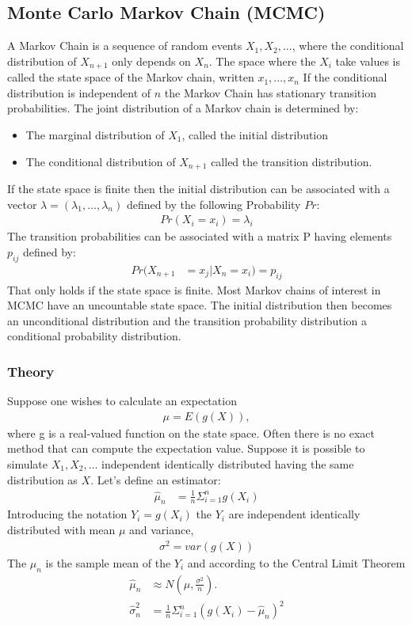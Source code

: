 \documentclass[english]{uzhpub}
\begin{document}
\subsection{Monte Carlo Markov Chain (MCMC)} \label{sec:MCMC}
A Markov Chain is a sequence of random events $X_1,X_2,...$, where the conditional distribution of $X_{n+1}$ only depends on $X_n$. The space where the $X_i$ take values is called the state space of the Markov chain, written ${x_1,...,x_n}$ If the conditional distribution is independent of $n$ the Markov Chain has stationary transition probabilities.
The joint distribution of a Markov chain is determined by:
\begin{itemize}
 \item The marginal distribution of $X_1$, called the initial distribution
 \item The conditional distribution of $X_{n+1}$ called the transition distribution.
\end{itemize}
If the state space is finite then the initial distribution can be associated with a vector $\lambda = (\lambda_1,...,\lambda_n)$ defined by the following Probability $Pr$:
\begin{align}
 Pr(X_i = x_i) = \lambda_i
\end{align}
The transition probabilities can be associated with a matrix P having elements $p_{ij}$ defined by:
\begin{align}
 Pr(X_{n+1} & = x_j | X_n = x_i) = p_{ij}
\end{align}
That only holds if the state space is finite. Most Markov chains of interest in MCMC have an uncountable state space. The initial distribution then becomes an unconditional distribution and the transition probability distribution a conditional probability distribution. \\



\subsubsection{Theory}
Suppose one wishes to calculate an expectation
\begin{align}
 \mu = E(g(X)),
\end{align}
where g is a real-valued function on the state space. Often there is no exact method that can compute the expectation value. Suppose it is possible to simulate $X_1,X_2,...$ independent identically distributed having the same distribution as $X$. Let's define an estimator:
\begin{align}
 \hat{\mu}_n & = \frac{1}{n} \Sigma^n_{i=1} g(X_i)
\end{align}
Introducing the notation $Y_i = g(X_i)$ the $Y_i$ are independent identically distributed with mean $\mu$ and variance,
\begin{align}
 \sigma^2 = var(g(X))
\end{align}
The $\hat{\mu}_n$ is the sample mean of the $Y_i$ and according to the Central Limit Theorem
\begin{align}
 \hat{\mu}_n      & \approx N \left(\mu,\frac{\sigma^2}{n} \right).       \\
 \hat{\sigma}^2_n & = \frac{1}{n} \Sigma^n_{i=1} (g(X_i) - \hat{\mu}_n)^2
\end{align}
\end{document}
